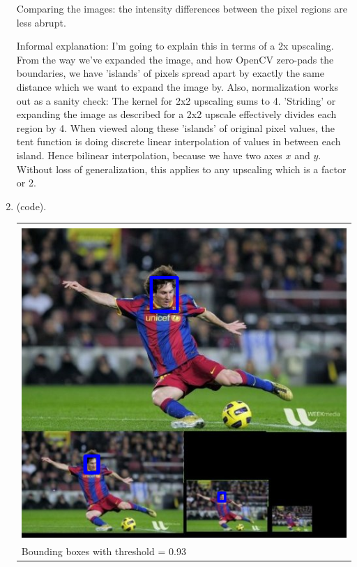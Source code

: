 \documentclass{article}
\begin{document}
\begin{enumerate}[label=(\roman*)]
Comparing the images: the intensity differences between the pixel regions are less abrupt.

Informal explanation: I'm going to explain this in terms of a 2x upscaling. From the way we've expanded the image, and how OpenCV zero-pads the boundaries, we have 'islands' of pixels spread apart by exactly the same distance which we want to expand the image by. Also, normalization works out as a sanity check: The kernel for 2x2 upscaling sums to 4. 'Striding' or expanding the image as described for a 2x2 upscale effectively divides each region by 4. When viewed along these 'islands' of original pixel values, the tent function is doing discrete linear interpolation of values in between each island. Hence bilinear interpolation, because we have two axes $x$ and $y$. Without loss of generalization, this applies to any upscaling which is a factor or 2.

\item %
(code).

\begin{tabular}[t]{l}
	\hline \\
	\includegraphics[width=1.0\textwidth]{img/image_detections.png} \\
	Bounding boxes with threshold = 0.93 \\
	\hline
\end{tabular}


\end{enumerate}
\end{document}
